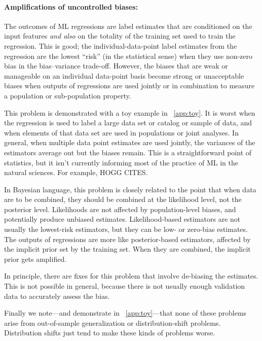 \documentclass[11pt]{article}
\begin{document}
\paragraph{Amplifications of uncontrolled biases:}
The outcomes of ML regressions are label estimates that are conditioned on the input features \emph{and also} on the totality of the training set used to train the regression.
This is good; the individual-data-point label estimates from the regression are the lowest ``risk'' (in the statistical sense) when they use non-zero bias in the bias--variance trade-off.
However, the biases that are weak or manageable on an individual data-point basis become strong or unacceptable biases when outputs of regressions are used jointly or in combination to measure a population or sub-population property.

This problem is demonstrated with a toy example in \appendixname~\ref{app:toy}.
It is worst when the regression is used to label a large data set or catalog or sample of data,
and when elements of that data set are used in populations or joint analyses.
In general, when multiple data point estimates are used jointly, the variances of the estimators average out but the biases remain.
This is a straightforward point of statistics, but it isn't currently informing most of the practice of ML in the natural sciences.
For example, HOGG CITES.

In Bayesian language, this problem is closely related to the point that when data are to be combined, they should be combined at the likelihood level, not the posterior level.
Likelihoods are not affected by population-level biases, and potentially produce unbiased estimates.
Likelihood-based estimators are not usually the lowest-risk estimators, but they can be low- or zero-bias estimates.
The outputs of regressions are more like posterior-based estimators, affected by the implicit prior set by the training set.
When they are combined, the implicit prior gets amplified.

In principle, there are fixes for this problem that involve de-biasing the estimates.
This is not possible in general, because there is not usually enough validation data to accurately assess the bias.

Finally we note---and demonstrate in \appendixname~\ref{app:toy}---that none of these problems arise from out-of-sample generalization or distribution-shift problems.
Distribution shifts just tend to make these kinds of problems worse.
\end{document}
